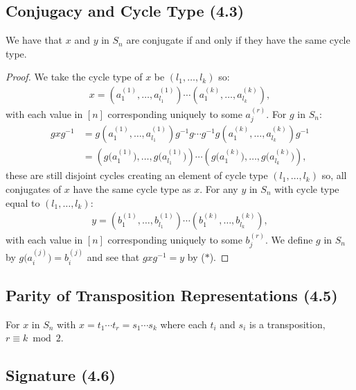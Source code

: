 \newpage

\subsection{Conjugacy and Cycle Type (4.3)} \label{4.3}

We have that $x$ and $y$ in $S_n$ are conjugate if and only if
they have the same cycle type.

\begin{proof}
    We take the cycle type of $x$ be $(l_1, \ldots, l_k)$ so: \begin{align*}
        x = (a_1^{(1)}, \ldots, a_{l_1}^{(1)}) \cdots (a_1^{(k)}, \ldots, a_{l_k}^{(k)}),
    \end{align*} with each value in $[n]$ corresponding uniquely to some $a_j^{(r)}$.
    For $g$ in $S_n$: \begin{align*}
        gxg^{-1} 
        &= g(a_1^{(1)}, \ldots, a_{l_1}^{(1)})g^{-1}g \cdots g^{-1}g(a_1^{(k)}, \ldots, a_{l_k}^{(k)})g^{-1} \\
        &= (g\bigl(a_1^{(1)}\bigr), \ldots, g\bigl(a_{l_1}^{(1)}\bigr)) 
        \cdots (g\bigl(a_1^{(k)}\bigr), \ldots, g\bigl(a_{l_k}^{(k)}\bigr)), \tag{$\ast$}
    \end{align*} these are still disjoint cycles creating an element of cycle type 
    $(l_1, \ldots, l_k)$ so, all conjugates of $x$ have the same cycle type as $x$.
    For any $y$ in $S_n$ with cycle type equal to $(l_1, \ldots, l_k)$: \begin{align*}
        y = (b_1^{(1)}, \ldots, b_{l_1}^{(1)}) \cdots (b_1^{(k)}, \ldots, b_{l_k}^{(k)}),
    \end{align*} with each value in $[n]$ corresponding uniquely to some $b_j^{(r)}$.
    We define $g$ in $S_n$ by $g\bigl(a_i^{(j)}\bigr) = b_i^{(j)}$ and see that $gxg^{-1} = y$
    by ($\ast$).
\end{proof}

\subsection{Parity of Transposition Representations (4.5)} \label{4.5} 

For $x$ in $S_n$ with $x = t_1 \cdots t_r = s_1 \cdots s_k$ where
each $t_i$ and $s_i$ is a transposition, $r \equiv k \bmod 2$.

\subsection{Signature (4.6)} \label{4.6}

